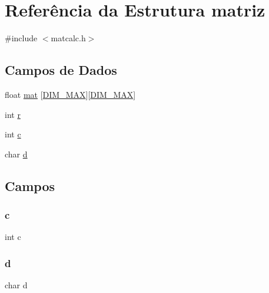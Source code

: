 \hypertarget{structmatriz}{}\section{Referência da Estrutura matriz}
\label{structmatriz}


{\ttfamily \#include $<$matcalc.\+h$>$}

\subsection*{Campos de Dados}
\begin{DoxyCompactItemize}
\item 
float \hyperlink{structmatriz_aeeb49c1202a8b505427fbdaaaff22528}{mat} \mbox{[}\hyperlink{matcalc_8h_a4bf6f11165a23227af11f1d0d75798a4}{D\+I\+M\+\_\+\+M\+AX}\mbox{]}\mbox{[}\hyperlink{matcalc_8h_a4bf6f11165a23227af11f1d0d75798a4}{D\+I\+M\+\_\+\+M\+AX}\mbox{]}
\item 
int \hyperlink{structmatriz_acab531abaa74a7e664e3986f2522b33a}{r}
\item 
int \hyperlink{structmatriz_a4e1e0e72dd773439e333c84dd762a9c3}{c}
\item 
char \hyperlink{structmatriz_a74bec2657eaae3ead1db1abe05154d4a}{d}
\end{DoxyCompactItemize}


\subsection{Campos}
\mbox{\label{structmatriz_a4e1e0e72dd773439e333c84dd762a9c3}} 
\subsubsection{\texorpdfstring{c}{c}}
{\footnotesize\ttfamily int c}

\mbox{\label{structmatriz_a74bec2657eaae3ead1db1abe05154d4a}} 
\subsubsection{\texorpdfstring{d}{d}}
{\footnotesize\ttfamily char d}

\mbox{\label{structmatriz_aeeb49c1202a8b505427fbdaaaff22528}} 
